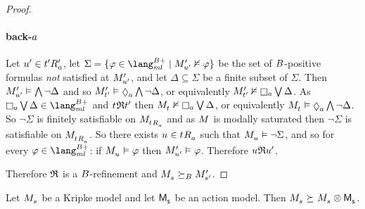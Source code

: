\begin{proof}
\paragraph{back-$a$}
Let ${{u}^{\prime}} \in {{{t}^{\prime}}} {R^{\prime}_{a}}$, let $\Sigma = \{\phi \in \langMlPlusBs \mid \kPModelP{\kStateUP} \nentails \phi\}$ be the set of $B$-positive formulas {\em not} satisfied at ${M^{\prime}_{{{u}^{\prime}}}}$, and let $\Delta \subseteq \Sigma$ be a finite subset of $\Sigma$.
Then ${M^{\prime}_{{{u}^{\prime}}}} \vDash \bigwedge \lnot \Delta$ and so $\kPModelP{\kStateTP} \entails \possibleA \bigwedge \lnot \Delta$, or equivalently $\kPModelP{\kStateTP} \nentails \necessaryA \bigvee \Delta$.
As $\necessaryA \bigvee \Delta \in \langMlPlusBs$ and $\kStateT \refinement \kStateTP$ then $\kPModel{\kStateT} \nentails \necessaryA \bigvee \Delta$, or equivalently $\kPModel{\kStateT} \entails \possibleA \bigwedge \lnot \Delta$.
So $\lnot \Sigma$ is finitely satisfiable on $\kPModel{\kSuccessorsA{\kStateT}}$ and as $\kModel$ is modally saturated then $\lnot \Sigma$ is satisfiable on $\kPModel{\kSuccessorsA{\kStateT}}$.
So there exists $\kStateU \in \kSuccessorsA{\kStateT}$ such that $\kPModel{\kStateU} \entails \lnot \Sigma$, and so for every $\phi \in \langMlPlusBs$: if $\kPModel{\kStateU} \entails \phi$ then ${M^{\prime}_{{{u}^{\prime}}}} \vDash \varphi$.
Therefore $\kStateU \refinement \kStateUP$.

Therefore $\mathfrak{R}$ is a $B$-refinement and $\kPModel{\kStateS} \simulatesBs \kPModelP{\kStateSP}$.
\end{proof}

\begin{proposition}
Let $\kPModel{\kStateS}$ be a Kripke model and let $\aPModel{\aStateS}$ be an action model.
Then $\kPModel{\kStateS} \simulates \kPModel{\kStateS} \exec \aPModel{\aStateS}$.
\end{proposition}

